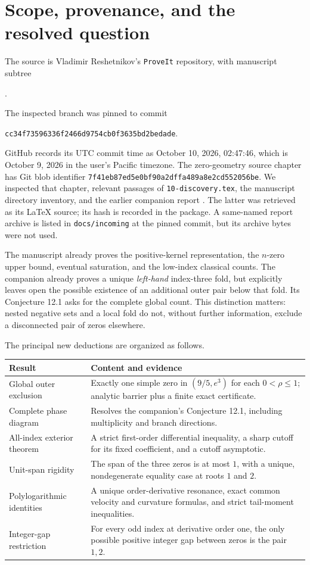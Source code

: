 \documentclass[11pt]{article}
\numberwithin{equation}{section}
\theoremstyle{definition}
\newcommand{\sha}{\texttt{cc34f73596336f2466d9754cb0f3635bd2bedade}}
\begin{document}
\section{Scope, provenance, and the resolved question}
\label{sec:scope}
The source is Vladimir Reshetnikov's \texttt{ProveIt} repository, with manuscript
subtree
\begin{center}\small
{}.
\end{center}
The inspected branch was pinned to commit
\begin{center}\small\sha.\end{center}
GitHub records its UTC commit time as October 10, 2026, 02:47:46, which is
October 9, 2026 in the user's Pacific timezone.
The zero-geometry source chapter has Git blob identifier
\texttt{7f41eb87ed5e0bf90a2dffa489a8e2cd552056be}.
We inspected that chapter, relevant passages of \texttt{10-discovery.tex}, the
manuscript directory inventory, and the earlier companion report
\cite{repo,previous}. The latter was retrieved as its LaTeX source; its hash is
recorded in the package. A same-named report archive is listed in
\texttt{docs/incoming} at the pinned commit, but its archive bytes were not used.

The manuscript already proves the positive-kernel representation, the
$n$-zero upper bound, eventual saturation, and the low-index classical counts.
The companion already proves a unique \emph{left-hand} index-three fold, but
explicitly leaves open the possible existence of an additional outer pair below
that fold. Its Conjecture 12.1 asks for the complete global count.
This distinction matters: nested negative sets and a local fold do not,
without further information, exclude a disconnected pair of zeros elsewhere.

The principal new deductions are organized as follows.
\begin{center}
\small
\begin{tabular}{p{.27\linewidth}p{.62\linewidth}}
\toprule
Result & Content and evidence\\
\midrule
Global outer exclusion & Exactly one simple zero in $(9/5,e^3)$ for each
$0<\rho\leq1$; analytic barrier plus a finite exact certificate.\\
Complete phase diagram & Resolves the companion's Conjecture 12.1, including
multiplicity and branch directions.\\
All-index exterior theorem & A strict first-order differential inequality,
a sharp cutoff for its fixed coefficient, and a cutoff asymptotic.\\
Unit-span rigidity & The span of the three zeros is at most $1$, with a unique,
nondegenerate equality case at roots $1$ and $2$.\\
Polylogarithmic identities & A unique order-derivative resonance, exact common
velocity and curvature formulas, and strict tail-moment inequalities.\\
Integer-gap restriction & For every odd index at derivative order one, the
only possible positive integer gap between zeros is the pair $1,2$.\\
\bottomrule
\end{tabular}
\end{center}
\end{document}
